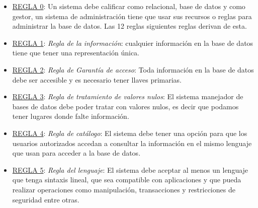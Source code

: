 \documentclass[12pt, letterpaper]{article}
\begin{document}
    \begin{itemize}

      \item[]\underline{REGLA 0}:  Un sistema debe calificar como relacional, base de 
                          datos y como gestor, un sistema de administración 
                          tiene que usar sus recursos o reglas para 
                          administrar la base de datos. Las 12 reglas 
                          siguientes reglas derivan de esta. \vspace{.3cm}

      \item[]\underline{REGLA 1}:  \textit{Regla de la información}: cualquier información
                          en la base de datos tiene que tener una representación 
                          única. \vspace{.3cm}

      \item[]\underline{REGLA 2}:  \textit{Regla de Garantía de acceso}: Toda información 
                          en la base de datos debe ser accesible y es necesario 
                          tener llaves primarias. \vspace{.3cm}

    \item[]\underline{REGLA 3}:  \textit{Regla de tratamiento de valores nulos}: El 
                          sistema manejador de bases de datos debe poder tratar 
                          con valores nulos, es decir que podamos tener lugares 
                          donde falte información. \vspace{.3cm}

    \item[]\underline{REGLA 4}:  \textit{Regla de catálogo}:  El sistema debe tener una 
                          opción para que los usuarios autorizados accedan a 
                          consultar la información en el mismo lenguaje que usan 
                          para acceder a la base de datos. \vspace{.3cm}

    \item[]\underline{REGLA 5}:  \textit{Regla del lenguaje}: El sistema debe aceptar 
                          al menos un lenguaje que tenga sintaxis lineal, que 
                          sea compatible con aplicaciones y que pueda realizar 
                          operaciones como manipulación, transacciones y 
                          restricciones de seguridad entre otras. \vspace{.3cm} 


\end{itemize}
\end{document}
